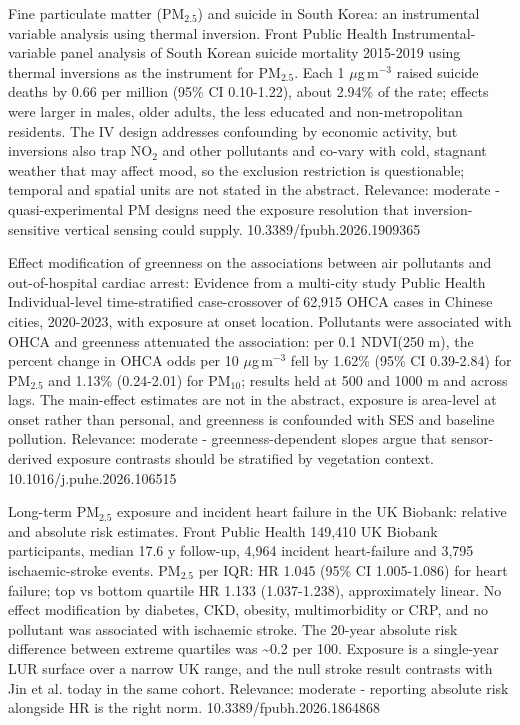 \documentclass[10pt]{article}
\begin{document}
{Fine particulate matter (PM$_{2.5}$) and suicide in South Korea: an instrumental variable analysis using thermal inversion.}
{Front Public Health}
{Instrumental-variable panel analysis of South Korean suicide mortality 2015-2019 using thermal inversions as the instrument for PM$_{2.5}$. Each 1 $\mu$g\,m$^{-3}$ raised suicide deaths by 0.66 per million (95\% CI 0.10-1.22), about 2.94\% of the rate; effects were larger in males, older adults, the less educated and non-metropolitan residents. The IV design addresses confounding by economic activity, but inversions also trap NO$_2$ and other pollutants and co-vary with cold, stagnant weather that may affect mood, so the exclusion restriction is questionable; temporal and spatial units are not stated in the abstract. Relevance: moderate - quasi-experimental PM designs need the exposure resolution that inversion-sensitive vertical sensing could supply.}
{10.3389/fpubh.2026.1909365}

\par{}\baselineskip{}\baselineskip
{}

{Effect modification of greenness on the associations between air pollutants and out-of-hospital cardiac arrest: Evidence from a multi-city study}
{Public Health}
{Individual-level time-stratified case-crossover of 62,915 OHCA cases in Chinese cities, 2020-2023, with exposure at onset location. Pollutants were associated with OHCA and greenness attenuated the association: per 0.1 NDVI(250 m), the percent change in OHCA odds per 10 $\mu$g\,m$^{-3}$ fell by 1.62\% (95\% CI 0.39-2.84) for PM$_{2.5}$ and 1.13\% (0.24-2.01) for PM$_{10}$; results held at 500 and 1000 m and across lags. The main-effect estimates are not in the abstract, exposure is area-level at onset rather than personal, and greenness is confounded with SES and baseline pollution. Relevance: moderate - greenness-dependent slopes argue that sensor-derived exposure contrasts should be stratified by vegetation context.}
{10.1016/j.puhe.2026.106515}

{Long-term PM$_{2.5}$ exposure and incident heart failure in the UK Biobank: relative and absolute risk estimates.}
{Front Public Health}
{149,410 UK Biobank participants, median 17.6 y follow-up, 4,964 incident heart-failure and 3,795 ischaemic-stroke events. PM$_{2.5}$ per IQR: HR 1.045 (95\% CI 1.005-1.086) for heart failure; top vs bottom quartile HR 1.133 (1.037-1.238), approximately linear. No effect modification by diabetes, CKD, obesity, multimorbidity or CRP, and no pollutant was associated with ischaemic stroke. The 20-year absolute risk difference between extreme quartiles was \textasciitilde{}0.2 per 100. Exposure is a single-year LUR surface over a narrow UK range, and the null stroke result contrasts with Jin et al. today in the same cohort. Relevance: moderate - reporting absolute risk alongside HR is the right norm.}
{10.3389/fpubh.2026.1864868}
\end{document}
